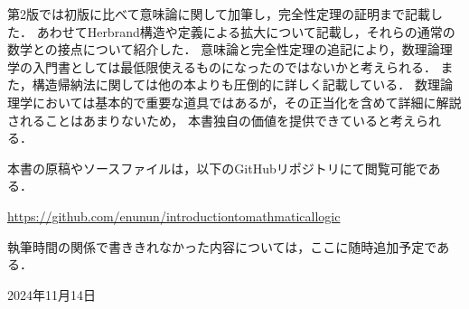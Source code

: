 第2版では初版に比べて意味論に関して加筆し，完全性定理の証明まで記載した．
あわせてHerbrand構造や定義による拡大について記載し，それらの通常の数学との接点について紹介した．
意味論と完全性定理の追記により，数理論理学の入門書としては最低限使えるものになったのではないかと考えられる．
また，構造帰納法に関しては他の本よりも圧倒的に詳しく記載している．
数理論理学においては基本的で重要な道具ではあるが，その正当化を含めて詳細に解説されることはあまりないため，
本書独自の価値を提供できていると考えられる．

本書の原稿やソースファイルは，以下のGitHubリポジトリにて閲覧可能である．

\begin{center}
	\url{https://github.com/enunun/introductiontomathmaticallogic}
\end{center}

執筆時間の関係で書ききれなかった内容については，ここに随時追加予定である．

\begin{flushright}
	2024年11月14日
\end{flushright}